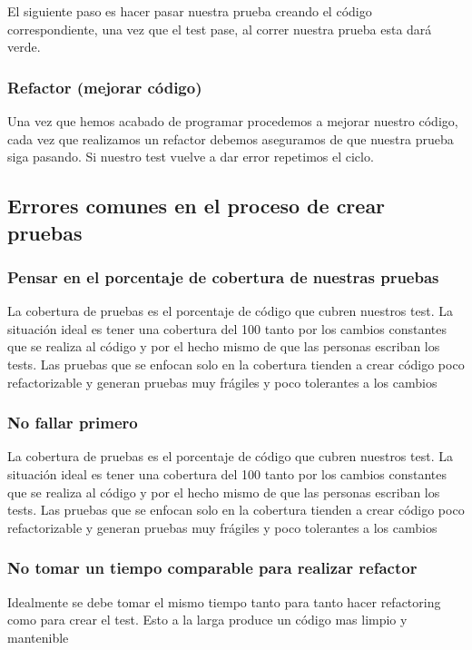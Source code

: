 El siguiente paso es hacer pasar nuestra prueba creando el código
correspondiente, una vez que el test pase, al correr nuestra prueba esta dará
verde.

\subsubsection{Refactor (mejorar código)}

Una vez que hemos acabado de programar procedemos a mejorar nuestro código,
cada vez que realizamos un refactor debemos aseguramos de que nuestra prueba
siga pasando. Si nuestro test vuelve a dar error repetimos el ciclo.

\subsection{Errores comunes en el proceso de crear pruebas}

\subsubsection{Pensar en el porcentaje de cobertura de nuestras pruebas}
La cobertura de pruebas es el porcentaje de código que cubren nuestros test. La
situación ideal es tener una cobertura del 100%
tanto por los cambios constantes que se realiza al código y por el hecho mismo
de que las personas escriban los tests. Las pruebas que se enfocan solo en la
cobertura tienden a crear código poco refactorizable y generan pruebas muy
frágiles y poco tolerantes a los cambios

\subsubsection{No fallar primero}
La cobertura de pruebas es el porcentaje de código que cubren nuestros test. La
situación ideal es tener una cobertura del 100%
tanto por los cambios constantes que se realiza al código y por el hecho mismo
de que las personas escriban los tests. Las pruebas que se enfocan solo en la
cobertura tienden a crear código poco refactorizable y generan pruebas muy
frágiles y poco tolerantes a los cambios

\subsubsection{No tomar un tiempo comparable para realizar refactor}
Idealmente se debe tomar el mismo tiempo tanto para tanto hacer refactoring
como para crear el test. Esto a la larga produce un código mas limpio y
mantenible

